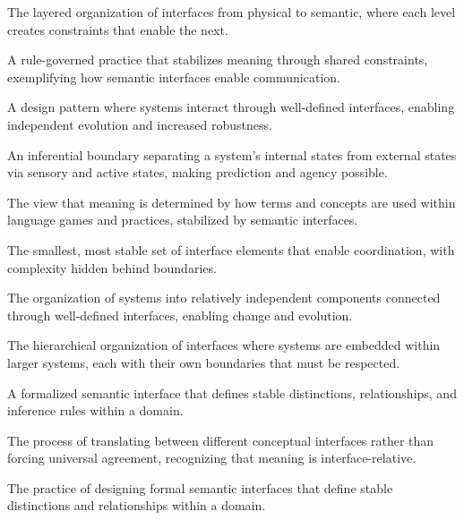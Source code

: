 \documentclass[
  openright]{book}
\renewenvironment{description}
  {\list{}{\labelwidth 0pt \itemindent-\leftmargin \leftmargin 2.5em
          \itemsep 0.4\baselineskip
          \parsep 0pt
          \let\makelabel\descriptionlabel}}
  {\endlist}
\newcommand*\descriptionlabel[1]{\hspace\labelsep\normalfont\bfseries #1}
\begin{document}
\begin{description}
\item[Interface Stack] The layered organization of interfaces from physical to semantic, where each level creates constraints that enable the next.

\item[Language Game] A rule-governed practice that stabilizes meaning through shared constraints, exemplifying how semantic interfaces enable communication.

\item[Loose Coupling] A design pattern where systems interact through well-defined interfaces, enabling independent evolution and increased robustness.

\item[Markov Blanket] An inferential boundary separating a system's internal states from external states via sensory and active states, making prediction and agency possible.

\item[Meaning as Use] The view that meaning is determined by how terms and concepts are used within language games and practices, stabilized by semantic interfaces.

\item[Minimal Core] The smallest, most stable set of interface elements that enable coordination, with complexity hidden behind boundaries.

\item[Modularity] The organization of systems into relatively independent components connected through well-defined interfaces, enabling change and evolution.

\item[Nested Boundaries] The hierarchical organization of interfaces where systems are embedded within larger systems, each with their own boundaries that must be respected.

\item[Ontology] A formalized semantic interface that defines stable distinctions, relationships, and inference rules within a domain.

\item[Ontology Alignment] The process of translating between different conceptual interfaces rather than forcing universal agreement, recognizing that meaning is interface-relative.

\item[Ontology Engineering] The practice of designing formal semantic interfaces that define stable distinctions and relationships within a domain.


\end{description}
\end{document}
